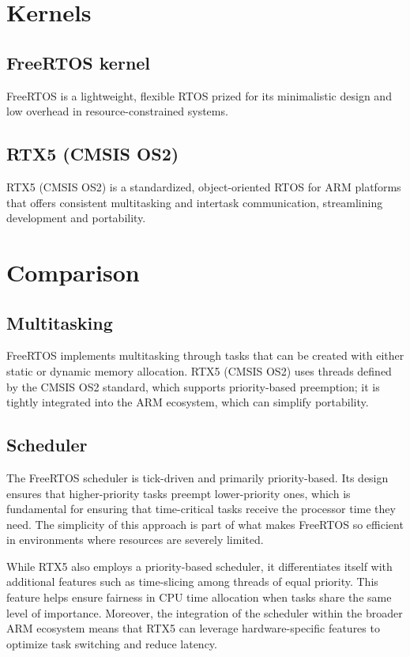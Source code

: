 \section*{Kernels}

\subsection*{FreeRTOS kernel}

FreeRTOS is a lightweight, flexible RTOS prized for its minimalistic design and low overhead in resource-constrained systems.

\subsection*{RTX5 (CMSIS OS2)}

RTX5 (CMSIS OS2) is a standardized, object-oriented RTOS for ARM platforms that offers consistent multitasking and intertask communication, streamlining development and portability.

\section*{Comparison}

\subsection*{Multitasking}

FreeRTOS implements multitasking through tasks that can be created with either static or dynamic memory allocation.
RTX5 (CMSIS OS2) uses threads defined by the CMSIS OS2 standard, which supports priority-based preemption; it is tightly integrated into the ARM ecosystem, which can simplify portability.

\subsection*{Scheduler}

The FreeRTOS scheduler is tick-driven and primarily priority-based. Its design ensures that higher-priority tasks preempt lower-priority ones, which is fundamental for ensuring that time-critical tasks receive the processor time they need. The simplicity of this approach is part of what makes FreeRTOS so efficient in environments where resources are severely limited.

While RTX5 also employs a priority-based scheduler, it differentiates itself with additional features such as time-slicing among threads of equal priority. This feature helps ensure fairness in CPU time allocation when tasks share the same level of importance. Moreover, the integration of the scheduler within the broader ARM ecosystem means that RTX5 can leverage hardware-specific features to optimize task switching and reduce latency.


